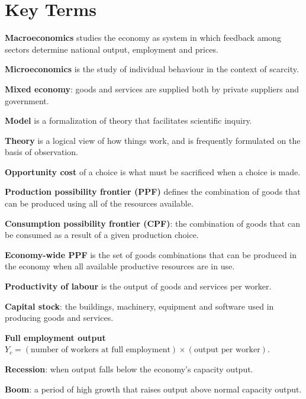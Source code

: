 \newpage
	\section*{Key Terms}
\begin{keyterms}
\textbf{Macroeconomics} studies the economy as system in which feedback among sectors determine national output, employment and prices.

\textbf{Microeconomics} is the study of individual behaviour in the context of scarcity.

\textbf{Mixed economy}: goods and services are supplied both by private suppliers and government.

\textbf{Model} is a formalization of theory that facilitates scientific inquiry.

\textbf{Theory} is a logical view of how things work, and is frequently formulated on the basis of observation.

\textbf{Opportunity cost} of a choice is what must be sacrificed when a choice is made.

\textbf{Production possibility frontier (PPF)} defines the combination of goods that can be produced using all of the resources available.

\textbf{Consumption possibility frontier (CPF)}: the combination of goods that can be consumed as a result of a given production choice.

\textbf{Economy-wide PPF} is the set of goods combinations that can be produced in the economy when all available productive resources are in use.

\textbf{Productivity of labour} is the output of goods and services per worker.

\textbf{Capital stock}: the buildings, machinery, equipment and software used in producing goods and services.

\textbf{Full employment output} $Y_c=(\text{number of workers at full employment})\times(\text{output per worker})$.

\textbf{Recession}: when output falls below the economy's capacity output.

\textbf{Boom}: a period of high growth that raises output above normal capacity output.
\end{keyterms}